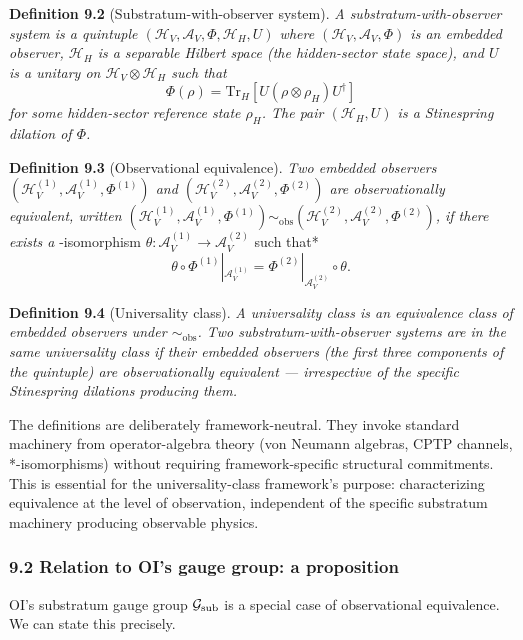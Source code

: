 \documentclass[
]{article}
\begin{document}
\textbf{Definition 9.2} (Substratum-with-observer system). \emph{A
substratum-with-observer system is a quintuple
\((\mathcal{H}_V, \mathcal{A}_V, \Phi, \mathcal{H}_H, U)\) where
\((\mathcal{H}_V, \mathcal{A}_V, \Phi)\) is an embedded observer,
\(\mathcal{H}_H\) is a separable Hilbert space (the hidden-sector state
space), and \(U\) is a unitary on
\(\mathcal{H}_V \otimes \mathcal{H}_H\) such that}
\[\Phi(\rho) = \mathrm{Tr}_H[U(\rho \otimes \rho_H) U^\dagger]\]
\emph{for some hidden-sector reference state \(\rho_H\). The pair
\((\mathcal{H}_H, U)\) is a Stinespring dilation of \(\Phi\).}

\textbf{Definition 9.3} (Observational equivalence). \emph{Two embedded
observers \((\mathcal{H}_V^{(1)}, \mathcal{A}_V^{(1)}, \Phi^{(1)})\) and
\((\mathcal{H}_V^{(2)}, \mathcal{A}_V^{(2)}, \Phi^{(2)})\) are
observationally equivalent, written
\((\mathcal{H}_V^{(1)}, \mathcal{A}_V^{(1)}, \Phi^{(1)}) \sim_{\mathrm{obs}} (\mathcal{H}_V^{(2)}, \mathcal{A}_V^{(2)}, \Phi^{(2)})\),
if there exists a }-isomorphism
\(\theta: \mathcal{A}_V^{(1)} \to \mathcal{A}_V^{(2)}\) such that*
\[\theta \circ \Phi^{(1)}|_{\mathcal{A}_V^{(1)}} = \Phi^{(2)}|_{\mathcal{A}_V^{(2)}} \circ \theta.\]

\textbf{Definition 9.4} (Universality class). \emph{A universality class
is an equivalence class of embedded observers under
\(\sim_{\mathrm{obs}}\). Two substratum-with-observer systems are in the
same universality class if their embedded observers (the first three
components of the quintuple) are observationally equivalent ---
irrespective of the specific Stinespring dilations producing them.}

The definitions are deliberately framework-neutral. They invoke standard
machinery from operator-algebra theory (von Neumann algebras, CPTP
channels, *-isomorphisms) without requiring framework-specific
structural commitments. This is essential for the universality-class
framework's purpose: characterizing equivalence at the level of
observation, independent of the specific substratum machinery producing
observable physics.

\hypertarget{relation-to-ois-gauge-group-a-proposition}{%
\subsubsection{9.2 Relation to OI's gauge group: a
proposition}\label{relation-to-ois-gauge-group-a-proposition}}

OI's substratum gauge group \(\mathcal{G}_{\rm sub}\) is a special case
of observational equivalence. We can state this precisely.
\end{document}
